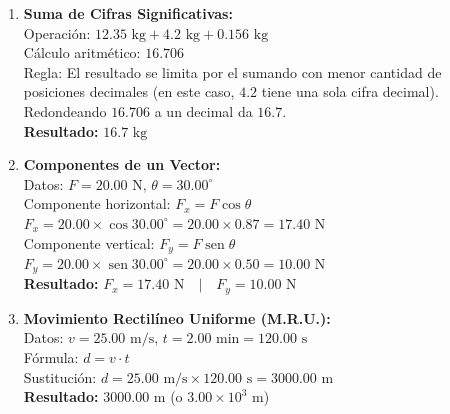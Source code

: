 \documentclass[9pt]{article}
\begin{document}
\begin{minipage}[t]{0.48\textwidth}
\begin{enumerate}
        \item \textbf{Suma de Cifras Significativas:} \\
        Operación: $12.35\text{ kg} + 4.2\text{ kg} + 0.156\text{ kg}$ \\
        Cálculo aritmético: $16.706$ \\
        Regla: El resultado se limita por el sumando con menor cantidad de posiciones decimales (en este caso, $4.2$ tiene una sola cifra decimal). Redondeando $16.706$ a un decimal da $16.7$. \\
        \textbf{Resultado: } $16.7\text{ kg}$
        
        \item \textbf{Componentes de un Vector:} \\
        Datos: $F = 20.00\text{ N}, \, \theta = 30.00^\circ$ \\
        Componente horizontal: $F_x = F \cos\theta$ \\
        $F_x = 20.00 \times \cos 30.00^\circ = 20.00 \times 0.87 = 17.40\text{ N}$ \\
        Componente vertical: $F_y = F \operatorname{sen}\theta$ \\
        $F_y = 20.00 \times \operatorname{sen} 30.00^\circ = 20.00 \times 0.50 = 10.00\text{ N}$ \\
        \textbf{Resultado: } $F_x = 17.40\text{ N} \quad | \quad F_y = 10.00\text{ N}$
        
        \item \textbf{Movimiento Rectilíneo Uniforme (M.R.U.):} \\
        Datos: $v = 25.00\text{ m/s}, \, t = 2.00\text{ min} = 120.00\text{ s}$ \\
        Fórmula: $d = v \cdot t$ \\
        Sustitución: $d = 25.00\text{ m/s} \times 120.00\text{ s} = 3000.00\text{ m}$ \\
        \textbf{Resultado: } $3000.00\text{ m}$ (o $3.00 \times 10^3\text{ m}$)
    \end{enumerate}
\end{minipage}
\hfill
\vrule
\hfill
\end{document}
